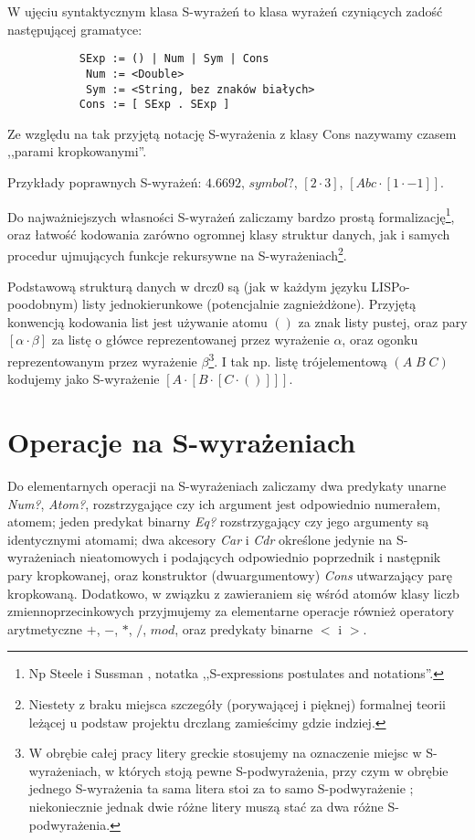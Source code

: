 \documentclass[a4paper]{article}
\begin{document}
W ujęciu syntaktycznym klasa S-wyrażeń to klasa wyrażeń czyniących zadość następującej gramatyce:

\begin{verbatim}
           SExp := () | Num | Sym | Cons
            Num := <Double>
            Sym := <String, bez znaków białych>
           Cons := [ SExp . SExp ]

\end{verbatim}

Ze względu na tak przyjętą notację S-wyrażenia z klasy Cons nazywamy czasem ,,parami kropkowanymi''.

Przykłady poprawnych S-wyrażeń: $4.6692$, $symbol?$, $[2 \cdot 3]$,
$[ Abc \cdot [1 \cdot -1]]$.


Do najważniejszych własności S-wyrażeń zaliczamy bardzo prostą formalizację\footnote{Np Steele i Sussman
\cite{ArtOfInterpreter}, notatka ,,S-expressions postulates and notations''.}, oraz łatwość kodowania zarówno
ogromnej klasy struktur danych, jak i samych procedur ujmujących funkcje rekursywne na
S-wyrażeniach\footnote{Niestety z braku miejsca szczegóły (porywającej i pięknej) formalnej teorii
leżącej u podstaw projektu drczlang zamieścimy gdzie indziej.}.

Podstawową strukturą danych w drcz0 są (jak w każdym języku LISPo-poodobnym) listy jednokierunkowe
(potencjalnie zagnieżdżone). Przyjętą konwencją kodowania list jest używanie atomu $()$ za znak
listy pustej, oraz pary $[ \alpha \cdot \beta ]$ za listę o główce reprezentowanej przez wyrażenie $\alpha$,
oraz ogonku reprezentowanym przez wyrażenie $\beta$\footnote{W obrębie całej pracy litery greckie stosujemy
na oznaczenie miejsc w S-wyrażeniach, w których stoją pewne S-podwyrażenia, przy czym w obrębie jednego S-wyrażenia
ta sama litera stoi za to samo S-podwyrażenie ; niekoniecznie jednak dwie różne litery muszą stać za dwa różne
S-podwyrażenia.}.
I tak np. listę trójelementową $(A \; B \; C)$ kodujemy jako S-wyrażenie $[A \cdot [B \cdot [C \cdot ()]]]$.


\section{Operacje na S-wyrażeniach}

Do elementarnych operacji na S-wyrażeniach zaliczamy dwa predykaty unarne \emph{Num?}, \emph{Atom?},
rozstrzygające czy ich argument jest odpowiednio numerałem, atomem; jeden predykat binarny \emph{Eq?}
rozstrzygający czy jego argumenty są identycznymi atomami; dwa akcesory \emph{Car} i \emph{Cdr} określone
jedynie na S-wyrażeniach nieatomowych i podających odpowiednio poprzednik i następnik pary kropkowanej,
oraz konstruktor (dwuargumentowy) \emph{Cons} utwarzający parę kropkowaną.
Dodatkowo, w związku z zawieraniem się wśród atomów klasy liczb zmiennoprzecinkowych przyjmujemy za
elementarne operacje również operatory arytmetyczne $+$, $-$, $*$, $/$, $mod$, oraz predykaty binarne $<$
i $>$.
\end{document}
